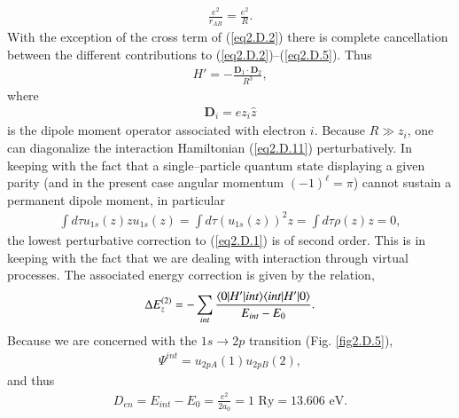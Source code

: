 \begin{subappendices}
\begin{align}
\frac{e^2}{r_{AB}}=\frac{e^2}{R}.
\end{align}
With the exception of the cross term of (\ref{eq2.D.2}) there is complete cancellation between the different contributions to (\ref{eq2.D.2})--(\ref{eq2.D.5}). Thus
\begin{align}\label{eq2.D.11}
H'=-\frac{\mathbf D_1\cdot\mathbf D_2}{R^3},
\end{align} 
where
\begin{align}\label{eq2.D.12}
\mathbf D_i=ez_i\hat z
\end{align} 
is the dipole moment operator associated with electron $i$. Because $R\gg z_i$, one can diagonalize the interaction Hamiltonian (\ref{eq2.D.11}) perturbatively. In keeping with the fact that   a single--particle quantum state displaying a given parity (and in the present case angular momentum $(-1)^\ell=\pi$) cannot sustain a permanent dipole moment, in particular
\begin{align}\label{eq2.D.13}
\int d\tau u_{1s}(z)zu_{1s}(z)=\int d\tau (u_{1s}(z))^2z=\int d\tau \rho(z)z=0,
\end{align} 
 the lowest perturbative correction to (\ref{eq2.D.1}) is of second order. This is in keeping with the fact that we are dealing with interaction through virtual processes. The associated energy correction is given by the relation,
 \begin{align}\label{eq2.D.14}
\Delta E_z^{(2)}=-\sum_{int}\frac{\langle {0|H'|int} \rangle\langle {int|H'|0} \rangle}{E_{int}-E_0}.
 \end{align} 
 Because we are concerned with the $1s\to 2p$ transition (Fig. \ref{fig2.D.5}),
  \begin{align}\label{eq2.D.15}
\Psi^{int}=u_{2pA}(1)u_{2pB}(2),
  \end{align} 
 and thus
  \begin{align}\label{eq2.D.16}
D_{en}=E_{int}-E_0=\frac{e^2}{2a_0}=1\text{ Ry}=13.606\text{ eV}.
   \end{align} 
   

\end{subappendices}
